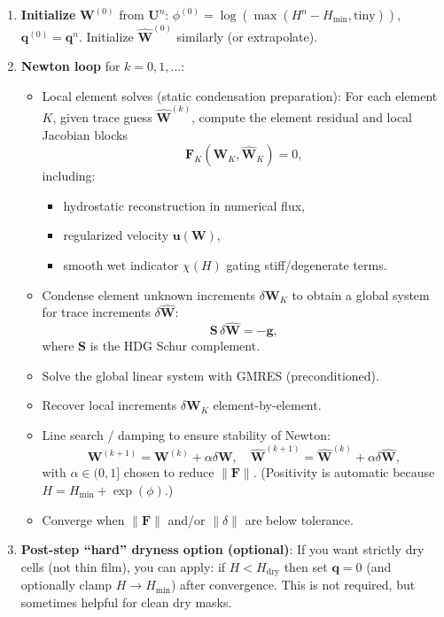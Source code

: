 \documentclass[11pt]{article}
\begin{document}
\begin{enumerate}
\item \textbf{Initialize} $\mathbf{W}^{(0)}$ from $\mathbf{U}^n$:  
$\phi^{(0)}=\log(\max(H^n-H_{\min},\text{tiny}))$, $\mathbf{q}^{(0)}=\mathbf{q}^n$.  
Initialize $\widehat{\mathbf{W}}^{(0)}$ similarly (or extrapolate).

\item \textbf{Newton loop} for $k=0,1,\dots$:
\begin{itemize}
\item Local element solves (static condensation preparation):  
For each element $K$, given trace guess $\widehat{\mathbf{W}}^{(k)}$, compute the element residual and local Jacobian blocks
\[
\mathbf{F}_K(\mathbf{W}_K,\widehat{\mathbf{W}}_K)=0,
\]
including:
\begin{itemize}
\item hydrostatic reconstruction in numerical flux,
\item regularized velocity $\mathbf{u}(\mathbf{W})$,
\item smooth wet indicator $\chi(H)$ gating stiff/degenerate terms.
\end{itemize}

\item Condense element unknown increments $\delta \mathbf{W}_K$ to obtain a global system for trace increments $\delta \widehat{\mathbf{W}}$:
\[
\mathbf{S}\,\delta \widehat{\mathbf{W}} = -\mathbf{g},
\]
where $\mathbf{S}$ is the HDG Schur complement.

\item Solve the global linear system with GMRES (preconditioned).

\item Recover local increments $\delta \mathbf{W}_K$ element-by-element.

\item Line search / damping to ensure stability of Newton:
\[
\mathbf{W}^{(k+1)}=\mathbf{W}^{(k)}+\alpha \delta \mathbf{W},\quad
\widehat{\mathbf{W}}^{(k+1)}=\widehat{\mathbf{W}}^{(k)}+\alpha \delta \widehat{\mathbf{W}},
\]
with $\alpha\in(0,1]$ chosen to reduce $\|\mathbf{F}\|$.  
(Positivity is automatic because $H=H_{\min}+\exp(\phi)$.)

\item Converge when $\|\mathbf{F}\|$ and/or $\|\delta\|$ are below tolerance.
\end{itemize}

\item \textbf{Post-step ``hard'' dryness option (optional)}:  
If you want strictly dry cells (not thin film), you can apply:
if $H < H_{\text{dry}}$ then set $\mathbf{q}=0$ (and optionally clamp $H\to H_{\min}$) after convergence.  
This is not required, but sometimes helpful for clean dry masks.
\end{enumerate}
\end{document}
